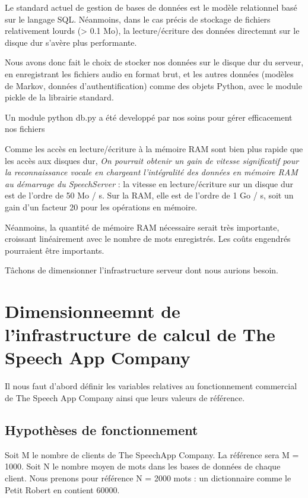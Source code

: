 \documentclass[a4paper,12pt]{report}
\begin{document}
\medskip{}

Le standard actuel de gestion de bases de données est le modèle relationnel basé sur le langage SQL. Néanmoins, dans le cas précis de stockage de fichiers relativement lourds (> 0.1 Mo), la lecture/écriture des données directemnt sur le disque dur s'avère plus performante.

\medskip{}

Nous avons donc fait le choix de stocker nos données sur le disque dur du serveur, en enregistrant les fichiers audio en format brut, et les autres données (modèles de Markov, données d'authentification) comme des objets Python, avec le module pickle de la librairie standard.

\smallskip{}

Un module python db.py a été developpé par nos soins pour gérer efficacement nos fichiers

\bigskip{}

Comme les accès en lecture/écriture à la mémoire RAM sont bien plus rapide que les accès aux disques dur,
\emph{On pourrait obtenir un gain de vitesse significatif pour la reconnaissance vocale en chargeant l'intégralité des données en mémoire RAM au démarrage du SpeechServer} : la vitesse en lecture/écriture sur un disque dur est de l'ordre de 50 Mo / s. Sur la RAM, elle est de l'ordre de 1 Go / s, soit un gain d'un facteur 20 pour les opérations en mémoire.

Néanmoins, la quantité de mémoire RAM nécessaire serait très importante, croissant linéairement avec le nombre de mots enregistrés. Les coûts engendrés pourraient être importants.

Tâchons de dimensionner l'infrastructure serveur dont nous aurions besoin.

\section{Dimensionneemnt de l'infrastructure de calcul de The Speech App Company}

Il nous faut d'abord définir les variables relatives au fonctionnement commercial de The Speech App Company ainsi que leurs valeurs de référence.

\subsection{Hypothèses de fonctionnement}

Soit M le nombre de clients de The SpeechApp Company. La référence sera M = 1000.
Soit N le nombre moyen de mots dans les bases de données de chaque client.
Nous prenons pour référence N = 2000 mots : un dictionnaire comme le Petit Robert en contient 60000.
\end{document}
